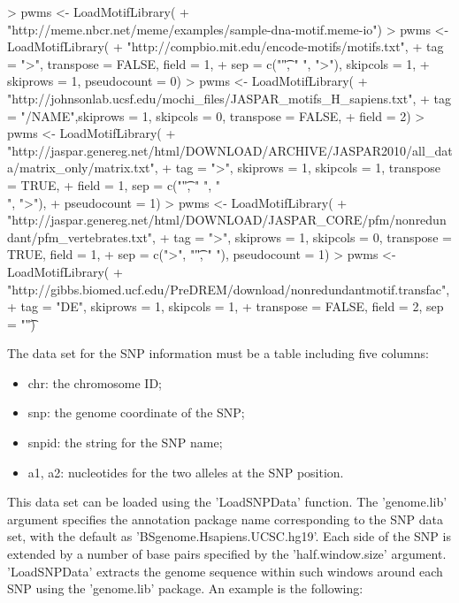 \documentclass[a4paper,10pt]{article}
\begin{document}
\begin{Schunk}
\begin{Sinput}
> pwms <- LoadMotifLibrary(
+  "http://meme.nbcr.net/meme/examples/sample-dna-motif.meme-io")
> pwms <- LoadMotifLibrary(
+  "http://compbio.mit.edu/encode-motifs/motifs.txt",
+  tag = ">", transpose = FALSE, field = 1, 
+  sep = c("\t", " ", ">"), skipcols = 1, 
+  skiprows = 1, pseudocount = 0)
> pwms <- LoadMotifLibrary(
+  "http://johnsonlab.ucsf.edu/mochi_files/JASPAR_motifs_H_sapiens.txt",
+  tag = "/NAME",skiprows = 1, skipcols = 0, transpose = FALSE,
+  field = 2)
> pwms <- LoadMotifLibrary(
+  "http://jaspar.genereg.net/html/DOWNLOAD/ARCHIVE/JASPAR2010/all_data/matrix_only/matrix.txt", 
+  tag = ">", skiprows = 1, skipcols = 1, transpose = TRUE, 
+  field = 1, sep = c("\t", " ", "\\[", "\\]", ">"),
+  pseudocount = 1)
> pwms <- LoadMotifLibrary(
+  "http://jaspar.genereg.net/html/DOWNLOAD/JASPAR_CORE/pfm/nonredundant/pfm_vertebrates.txt",
+  tag = ">", skiprows = 1, skipcols = 0, transpose = TRUE, field = 1, 
+  sep = c(">", "\t", " "), pseudocount = 1)
> pwms <- LoadMotifLibrary(
+  "http://gibbs.biomed.ucf.edu/PreDREM/download/nonredundantmotif.transfac", 
+  tag = "DE", skiprows = 1, skipcols = 1, 
+  transpose = FALSE, field = 2, sep = "\t")
\end{Sinput}
\end{Schunk}

The data set for the SNP information must be a table including five columns:

\begin{itemize}
\item chr: the chromosome ID;
\item snp: the genome coordinate of the SNP;
\item snpid: the string for the SNP name;
\item a1, a2: nucleotides for the two alleles at the SNP position.
\end{itemize}
  
This data set can be loaded using the 'LoadSNPData' function. The 'genome.lib' argument specifies the annotation package name corresponding to the SNP data set, with the default as 'BSgenome.Hsapiens.UCSC.hg19'. Each side of the SNP is extended by a number of base pairs specified by the 'half.window.size' argument. 'LoadSNPData' extracts the genome sequence within such windows around each SNP using the 'genome.lib' package. An example is the following:
\end{document}
